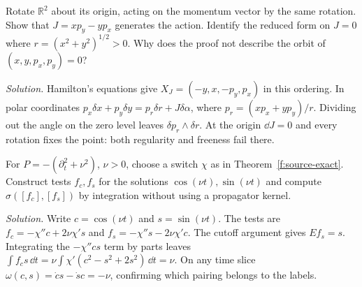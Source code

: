 \begin{exercise}
Rotate $\mathbb R^2$ about its origin, acting on the momentum vector by the same rotation. Show that $J=xp_y-yp_x$ generates the action. Identify the reduced form on $J=0$ where $r=(x^2+y^2)^{1/2}>0$. Why does the proof not describe the orbit of $(x,y,p_x,p_y)=0$?
\end{exercise}
\noindent\emph{Solution.} Hamilton's equations give $X_J=(-y,x,-p_y,p_x)$ in this ordering. In polar coordinates $p_x\delta x+p_y\delta y=p_r\delta r+J\delta\alpha$, where $p_r=(xp_x+yp_y)/r$. Dividing out the angle on the zero level leaves $\delta p_r\wedge\delta r$. At the origin $\dd J=0$ and every rotation fixes the point: both regularity and freeness fail there.

\begin{exercise}
For $P=-(\partial_t^2+\nu^2)$, $\nu>0$, choose a switch $\chi$ as in Theorem~\ref{f:source-exact}. Construct tests $f_c,f_s$ for the solutions $\cos(\nu t),\sin(\nu t)$ and compute $\sigma([f_c],[f_s])$ by integration without using a propagator kernel.
\end{exercise}
\noindent\emph{Solution.} Write $c=\cos(\nu t)$ and $s=\sin(\nu t)$. The tests are $f_c=-\chi''c+2\nu\chi's$ and $f_s=-\chi''s-2\nu\chi'c$. The cutoff argument gives $Ef_s=s$. Integrating the $-\chi''cs$ term by parts leaves $\int f_c s\,\dd t=\nu\int\chi'(c^2-s^2+2s^2)\,\dd t=\nu$. On any time slice $\omega(c,s)=\dot c s-\dot s c=-\nu$, confirming which pairing belongs to the labels.

